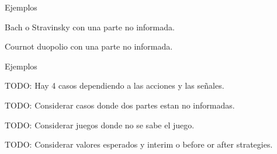 \documentclass[notes, 11pt]{beamer} %
\newenvironment{wideitemize}{\itemize\addtolength{\itemsep}{10pt}}{\enditemize}
\begin{document}
\begin{frame}{Ejemplos}
	\begin{wideitemize}
		\item<1-> Bach o Stravinsky con una parte no informada.
		\item<2-> Cournot duopolio con una parte no informada.
	\end{wideitemize}
\end{frame}

\begin{frame}{Ejemplos}
	\begin{wideitemize}
		\item<1-> TODO: Hay 4 casos dependiendo a las acciones y las se\~nales.
		\item<2-> TODO: Considerar casos donde dos partes estan no informadas.
		\item<3-> TODO: Considerar juegos donde no se sabe el juego.
		\item<4-> TODO: Considerar valores esperados y interim o before or after strategies.
	\end{wideitemize}
\end{frame}

\begin{frame}
\maketitle
\end{frame}
\end{document}
